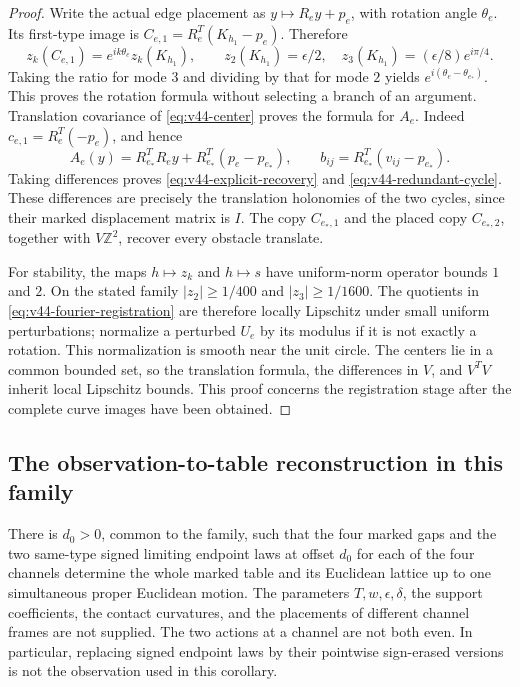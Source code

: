 \begin{proof}
Write the actual edge placement as $y\mapsto R_e y+p_e$, with rotation
angle $\theta_e$.  Its first-type image is
$C_{e,1}=R_e^T(K_{h_1}-p_e)$.  Therefore
\[
 z_k(C_{e,1})=e^{ik\theta_e}z_k(K_{h_1}),\qquad
 z_2(K_{h_1})=\epsilon/2,\quad
 z_3(K_{h_1})=(\epsilon/8)e^{i\pi/4}.
\]
Taking the ratio for mode $3$ and dividing by that for mode $2$ yields
$e^{i(\theta_e-\theta_{e_*})}$.  This proves the rotation formula without
selecting a branch of an argument.  Translation covariance of
\eqref{eq:v44-center} proves the formula for $A_e$.  Indeed
$c_{e,1}=R_e^T(-p_e)$, and hence
\[
 A_e(y)=R_{e_*}^TR_e y+R_{e_*}^T(p_e-p_{e_*}),\qquad
 b_{ij}=R_{e_*}^T(v_{ij}-p_{e_*}).
\]
Taking differences proves \eqref{eq:v44-explicit-recovery} and
\eqref{eq:v44-redundant-cycle}.  These differences are precisely the
translation holonomies of the two cycles, since their marked displacement
matrix is $I$.  The copy $C_{e_*,1}$ and the placed copy $C_{e_*,2}$,
together with $V\mathbb Z^2$, recover every obstacle translate.

For stability, the maps $h\mapsto z_k$ and $h\mapsto s$ have uniform-norm
operator bounds $1$ and $2$.  On the stated family
$|z_2|\ge1/400$ and $|z_3|\ge1/1600$.  The quotients in
\eqref{eq:v44-fourier-registration} are therefore locally Lipschitz
under small uniform perturbations; normalize a perturbed $U_e$ by its
modulus if it is not exactly a rotation.  This normalization is smooth
near the unit circle.  The centers lie in a common bounded set, so the
translation formula, the differences in $V$, and $V^TV$ inherit local
Lipschitz bounds.  This proof concerns the registration stage after the
complete curve images have been obtained.
\end{proof}

\subsection{The observation-to-table reconstruction in this family}

\begin{corollary}
\label{cor:v44-eight-laws}
There is $d_0>0$, common to the family, such that the four marked gaps and
the two same-type signed limiting endpoint laws at offset $d_0$ for each
of the four channels determine the whole marked table and its Euclidean
lattice up to one simultaneous proper Euclidean motion.  The parameters
$T,w,\epsilon,\delta$, the support coefficients, the contact curvatures,
and the placements of different channel frames are not supplied.
The two actions at a channel are not both even.  In particular, replacing
signed endpoint laws by their pointwise sign-erased versions is not the
observation used in this corollary.
\end{corollary}

